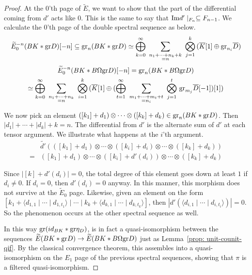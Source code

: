\documentclass[../thesis.tex]{subfiles}
\begin{document}
\begin{proof}
                At the $0$'th page of $\widetilde{E}$, we want to show that the part of the differential coming from $d'$ acts like $0$. This is the same to say that $\tt{Im}d'\mid_{F_n} \subseteq F_{n-1}$. We calculate the $0$'th page of the double spectral sequence as below.
                \begin{align*}
                    \widetilde{E}_0^{-n}(BK\ast\tt{gr}D)[-n] \subseteq \tt{gr}_n(BK\ast\tt{gr}D) \simeq \bigoplus_{k=0}^\infty\,\,\sum_{\substack{n_1+\cdots + n_k + k \\ = n}}\,\,\bigotimes_{j=1}^k\,(\overline{K}[1]\oplus\tt{gr}_{n_i}\overline{D})
                \end{align*}
                \begin{multline*}
                    \widetilde{E}_0^{-n}(BK\ast B\Omega\tt{gr}D)[-n] = \tt{gr}_n(BK\ast B\Omega\tt{gr}D) \\ 
                    \simeq \bigoplus_{k=0}^\infty\,\,\sum_{\substack{n_1+\cdots + n_k \\ = n}}\,\,\bigotimes_{i=1}^k\,(\overline{K}[1]\oplus(\bigoplus_{t=1}^\infty\,\,\sum_{\substack{m_1+\cdots + m_t + t \\ = n_i}}\,\,\bigotimes_{j=1}^t\,\tt{gr}_{m_j}\overline{D}[-1])[1])
                \end{multline*}

                We now pick an element $([k_1] + d_1) \otimes \cdots \otimes ([k_k] + d_k) \in \tt{gr}_n(BK\ast \tt{gr}D)$. Then $|d_1| + \cdots + |d_k| + k = n$. The differential from $d'$ is the alternate sum of $d'$ at each tensor argument. We illustrate what happens at the $i$'th argument.
                \begin{align*}                    
                    & \widetilde{d'}(([k_1] + d_1) \otimes \cdots \otimes ([k_i] + d_i) \otimes \cdots \otimes ([k_k] + d_k)) \\ 
                    = & ([k_1] + d_1) \otimes \cdots \otimes ([k_i] + d'(d_i)) \otimes \cdots \otimes ([k_k] + d_k) 
                \end{align*}

                Since $|[k]+d'(d_i)| = 0$, the total degree of this element goes down at least $1$ if $d_i \neq 0$. If $d_i = 0$, then $d'(d_i) = 0$ anyway. In this manner, this morphism does not survive at the $\widetilde{E}_0$ page. Likewise, given an element on the form $[k_1 + \langle d_{1,1} \mid \cdots \mid d_{1,t_1} \rangle \mid \cdots \mid k_k + \langle d_{k,1} \mid \cdots \mid d_{k,t_k} \rangle ]$, then $|d'(\langle d_{i,1} \mid \cdots \mid d_{i,t_i} \rangle)| = 0$. So the phenomenon occurs at the other spectral sequence as well.
                
                In this way $\tt{gr}(id_{BK}\ast\tt{gr}\eta_D)$, is in fact a quasi-isomorphism between the sequences $\widetilde{E}(BK\ast\tt{gr}D) \rightarrow \widetilde{E}(BK\ast B\Omega\tt{gr}D)$ just as Lemma~\ref{prop: unit-counit-qif}. By the classical convergence theorem, this assembles into a quasi-isomorphism on the $E_1$ page of the previous spectral sequences, showing that $\pi$ is a filtered quasi-isomorphism.
            \end{proof}
\end{document}

